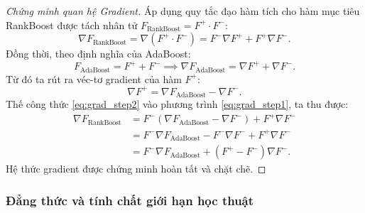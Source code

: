 \begin{proof}[Chứng minh quan hệ Gradient]
Áp dụng quy tắc đạo hàm tích cho hàm mục tiêu RankBoost được tách nhân tử $F_{\text{RankBoost}} = F^+ \cdot F^-$:
\begin{equation}
    \nabla F_{\text{RankBoost}} = \nabla (F^+ \cdot F^-) = F^- \nabla F^+ + F^+ \nabla F^-.
    \label{eq:grad_step1}
\end{equation}
Đồng thời, theo định nghĩa của AdaBoost:
\[
    F_{\text{AdaBoost}} = F^+ + F^- \implies \nabla F_{\text{AdaBoost}} = \nabla F^+ + \nabla F^-.
\]
Từ đó ta rút ra véc-tơ gradient của hàm $F^+$:
\begin{equation}
    \nabla F^+ = \nabla F_{\text{AdaBoost}} - \nabla F^-.
    \label{eq:grad_step2}
\end{equation}
Thế công thức \eqref{eq:grad_step2} vào phương trình \eqref{eq:grad_step1}, ta thu được:
\begin{align*}
    \nabla F_{\text{RankBoost}} &= F^- \left( \nabla F_{\text{AdaBoost}} - \nabla F^- \right) + F^+ \nabla F^- \\
    &= F^- \nabla F_{\text{AdaBoost}} - F^- \nabla F^- + F^+ \nabla F^- \\
    &= F^- \nabla F_{\text{AdaBoost}} + (F^+ - F^-) \nabla F^-.
\end{align*}
Hệ thức gradient được chứng minh hoàn tất và chặt chẽ.
\end{proof}

\subsubsection*{Đẳng thức và tính chất giới hạn học thuật}

